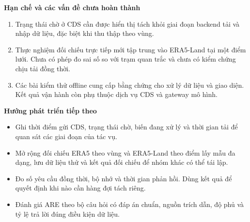 \documentclass[12pt,a4paper]{article}
\newcommand{\heading}[1]{\par\medskip\noindent\textbf{#1}\par\nopagebreak}
\begin{document}
\heading{Hạn chế và các vấn đề chưa hoàn thành}
\begin{enumerate}
\item Trạng thái chờ ở CDS cần được hiển thị tách khỏi giai đoạn backend tải và nhập dữ liệu, đặc biệt khi thu thập theo vùng.
\item Thực nghiệm đối chiếu trực tiếp mới tập trung vào ERA5-Land tại một điểm lưới. Chưa có phép đo sai số so với trạm quan trắc và chưa có kiểm chứng chịu tải đồng thời.
\item Các bài kiểm thử offline cung cấp bằng chứng cho xử lý dữ liệu và giao diện. Kết quả vận hành còn phụ thuộc dịch vụ CDS và gateway mô hình.
\end{enumerate}
\heading{Hướng phát triển tiếp theo}
\begin{itemize}
\item Ghi thời điểm gửi CDS, trạng thái chờ, biến đang xử lý và thời gian tải để quan sát các giai đoạn của tác vụ.
\item Mở rộng đối chiếu ERA5 theo vùng và ERA5-Land theo điểm lấy mẫu đa dạng, lưu dữ liệu thử và kết quả đối chiếu để nhóm khác có thể tái lập.
\item Đo số yêu cầu đồng thời, bộ nhớ và thời gian phản hồi. Dùng kết quả để quyết định khi nào cần hàng đợi tách riêng.
\item Đánh giá ARE theo bộ câu hỏi có đáp án chuẩn, nguồn trích dẫn, độ phủ và tỷ lệ trả lời đúng điều kiện dữ liệu.
\end{itemize}
\end{document}

